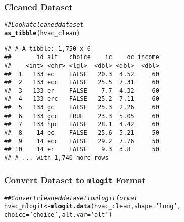 \documentclass{beamer}\usepackage[]{graphicx}\usepackage[]{color}
\makeatletter
\newcommand{\hlnum}[1]{\textcolor[rgb]{0.686,0.059,0.569}{#1}}%
\newcommand{\hlstr}[1]{\textcolor[rgb]{0.192,0.494,0.8}{#1}}%
\newcommand{\hlcom}[1]{\textcolor[rgb]{0.678,0.584,0.686}{\textit{#1}}}%
\newcommand{\hlopt}[1]{\textcolor[rgb]{0,0,0}{#1}}%
\newcommand{\hlstd}[1]{\textcolor[rgb]{0.345,0.345,0.345}{#1}}%
\newcommand{\hlkwb}[1]{\textcolor[rgb]{0.69,0.353,0.396}{#1}}%
\newcommand{\hlkwc}[1]{\textcolor[rgb]{0.333,0.667,0.333}{#1}}%
\newcommand{\hlkwd}[1]{\textcolor[rgb]{0.737,0.353,0.396}{\textbf{#1}}}%
\newenvironment{kframe}{%
 \def\at@end@of@kframe{}%
 \ifinner\ifhmode%
  \def\at@end@of@kframe{\end{minipage}}%
  \begin{minipage}{\columnwidth}%
 \fi\fi%
 \def\FrameCommand##1{\hskip\@totalleftmargin \hskip-\fboxsep
 \colorbox{shadecolor}{##1}\hskip-\fboxsep
     \hskip-\linewidth \hskip-\@totalleftmargin \hskip\columnwidth}%
 \MakeFramed {\advance\hsize-\width
   \@totalleftmargin\z@ \linewidth\hsize
   \@setminipage}}%
 {\par\unskip\endMakeFramed%
 \at@end@of@kframe}
\newenvironment{knitrout}{}{} %
\makeatother
\begin{document}

\begin{frame}[fragile]\frametitle{Cleaned Dataset}
\begin{knitrout}\footnotesize
{}\color{fgcolor}\begin{kframe}
\begin{alltt}
\hlcom{## Look at cleaned dataset}
\hlkwd{as_tibble}\hlstd{(hvac_clean)}
\end{alltt}
\begin{verbatim}
## # A tibble: 1,750 x 6
##       id alt   choice    ic    oc income
##    <int> <chr> <lgl>  <dbl> <dbl>  <dbl>
##  1   133 ec    FALSE   20.3  4.52     60
##  2   133 ecc   FALSE   25.5  7.31     60
##  3   133 er    FALSE    7.7  4.32     60
##  4   133 erc   FALSE   25.2  7.11     60
##  5   133 gc    FALSE   25.3  2.26     60
##  6   133 gcc   TRUE    23.3  5.05     60
##  7   133 hpc   FALSE   28.1  4.42     60
##  8    14 ec    FALSE   25.6  5.21     50
##  9    14 ecc   FALSE   29.2  7.76     50
## 10    14 er    FALSE    9.3  3.8      50
## # ... with 1,740 more rows
\end{verbatim}
\end{kframe}
\end{knitrout}
\end{frame}

\begin{frame}[fragile]\frametitle{Convert Dataset to \texttt{mlogit} Format}
\begin{knitrout}\footnotesize
{}\color{fgcolor}\begin{kframe}
\begin{alltt}
\hlcom{## Convert cleaned dataset to mlogit format}
\hlstd{hvac_mlogit} \hlkwb{<-} \hlkwd{mlogit.data}\hlstd{(hvac_clean,} \hlkwc{shape} \hlstd{=} \hlstr{'long'}\hlstd{,}
                           \hlkwc{choice} \hlstd{=} \hlstr{'choice'}\hlstd{,} \hlkwc{alt.var} \hlstd{=} \hlstr{'alt'}\hlstd{)}
\end{alltt}
\end{kframe}
\end{knitrout}
\end{frame}
\end{document}
